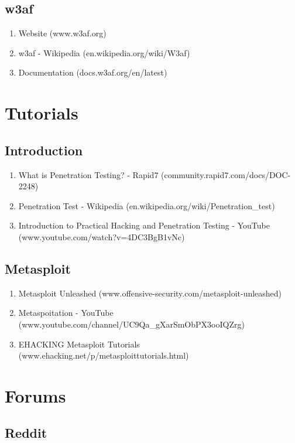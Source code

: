 \documentclass[a4paper]{article}
\begin{document}
\subsection{w3af}
\begin{enumerate}
	\item Website (www.w3af.org)
	\item w3af - Wikipedia (en.wikipedia.org/wiki/W3af)
    \item Documentation (docs.w3af.org/en/latest)
\end{enumerate}


\section{Tutorials}

\subsection{Introduction}
\begin{enumerate}
	\item What is Penetration Testing? - Rapid7 (community.rapid7.com/docs/DOC-2248)
	\item Penetration Test - Wikipedia (en.wikipedia.org/wiki/Penetration\_test)
    \item Introduction to Practical Hacking and Penetration Testing - YouTube \\(www.youtube.com/watch?v=4DC3BgB1vNc)
\end{enumerate}

\subsection{Metasploit}
\begin{enumerate}
	\item Metasploit Unleashed (www.offensive-security.com/metasploit-unleashed)
    \item Metaspoitation - YouTube (www.youtube.com/channel/UC9Qa\_gXarSmObPX3ooIQZrg)
	\item EHACKING Metasploit Tutorials (www.ehacking.net/p/metasploittutorials.html)
\end{enumerate}
	
\section{Forums}

\subsection{Reddit}
\end{document}
